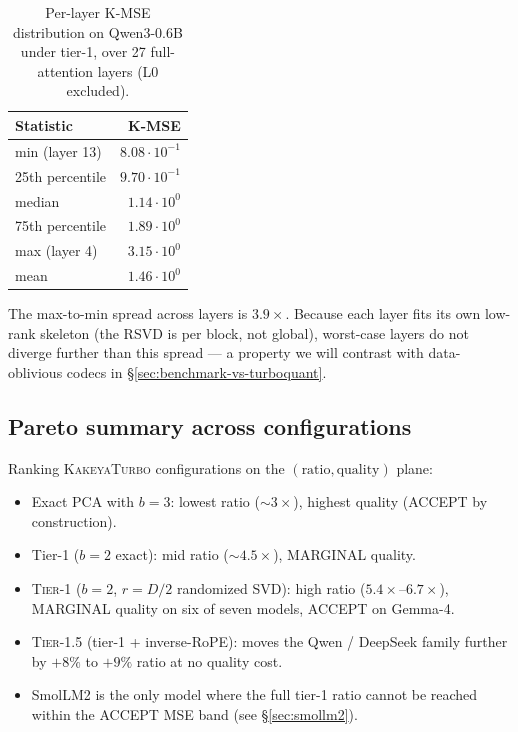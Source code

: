 \documentclass[11pt,a4paper]{article}
\theoremstyle{definition}
\theoremstyle{plain}
\begin{document}
\begin{table}[H]
\centering
\small
\caption{Per-layer K-MSE distribution on Qwen3-0.6B under tier-1, over 27 full-attention layers (L0 excluded).}
\label{tab:mse-perlayer}
\begin{tabular}{lr}
  \toprule
  Statistic & K-MSE \\
  \midrule
  min (layer 13) & $8.08\!\cdot\!10^{-1}$ \\
  25th percentile & $9.70\!\cdot\!10^{-1}$ \\
  median          & $1.14\!\cdot\!10^{0}$  \\
  75th percentile & $1.89\!\cdot\!10^{0}$  \\
  max (layer 4)   & $3.15\!\cdot\!10^{0}$  \\
  mean            & $1.46\!\cdot\!10^{0}$  \\
  \bottomrule
\end{tabular}
\end{table}

The max-to-min spread across layers is $3.9\times$. Because each layer fits its own low-rank skeleton (the RSVD is per block, not global), worst-case layers do not diverge further than this spread --- a property we will contrast with data-oblivious codecs in \S\ref{sec:benchmark-vs-turboquant}.

\subsection{Pareto summary across configurations}
\label{sec:pareto}

Ranking \textsc{KakeyaTurbo} configurations on the $(\text{ratio}, \text{quality})$ plane:
\begin{itemize}[leftmargin=*]
  \item Exact PCA with $b=3$: lowest ratio ($\sim 3\times$), highest quality (ACCEPT by construction).
  \item Tier-1 ($b=2$ exact): mid ratio ($\sim 4.5\times$), MARGINAL quality.
  \item \textsc{Tier-1} ($b=2$, $r=D/2$ randomized SVD): high ratio ($5.4\times$--$6.7\times$), MARGINAL quality on six of seven models, ACCEPT on Gemma-4.
  \item \textsc{Tier-1.5} (tier-1 + inverse-RoPE): moves the Qwen / DeepSeek family further by $+8\%$ to $+9\%$ ratio at no quality cost.
  \item SmolLM2 is the only model where the full tier-1 ratio cannot be reached within the ACCEPT MSE band (see \S\ref{sec:smollm2}).
\end{itemize}
\end{document}

